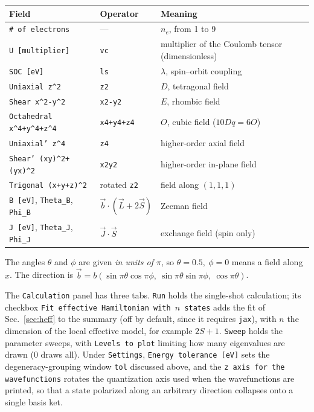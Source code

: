 \documentclass[11pt,a4paper]{article}
\newcommand{\op}[1]{\texttt{#1}}
\begin{document}
\begin{center}
\begin{tabular}{lll}
\toprule
Field & Operator & Meaning\\
\midrule
\op{\# of electrons} & --- & $n_e$, from 1 to 9\\
\op{U [multiplier]}  & \op{vc} & multiplier of the Coulomb tensor (dimensionless)\\
\op{SOC [eV]}        & \op{ls} & $\lambda$, spin--orbit coupling\\
\op{Uniaxial z\^{}2} & \op{z2} & $D$, tetragonal field\\
\op{Shear x\^{}2-y\^{}2} & \op{x2-y2} & $E$, rhombic field\\
\op{Octahedral x\^{}4+y\^{}4+z\^{}4} & \op{x4+y4+z4} & $O$, cubic field ($10Dq=6O$)\\
\op{Uniaxial' z\^{}4} & \op{z4} & higher-order axial field\\
\op{Shear' (xy)\^{}2+(yx)\^{}2} & \op{x2y2} & higher-order in-plane field\\
\op{Trigonal (x+y+z)\^{}2} & rotated \op{z2} & field along $(1,1,1)$\\
\op{B [eV]}, \op{Theta\_B}, \op{Phi\_B} & $\vec b\cdot(\vec L+2\vec S)$ & Zeeman field\\
\op{J [eV]}, \op{Theta\_J}, \op{Phi\_J} & $\vec J\cdot\vec S$ & exchange field (spin only)\\
\bottomrule
\end{tabular}
\end{center}

\noindent
The angles $\theta$ and $\phi$ are given \emph{in units of $\pi$}, so
$\theta=0.5,\ \phi=0$ means a field along $x$.  The direction is
$\vec b = b(\sin\pi\theta\cos\pi\phi,\ \sin\pi\theta\sin\pi\phi,\ \cos\pi\theta)$.

The \op{Calculation} panel has three tabs.  \op{Run} holds the single-shot
calculation; its checkbox \op{Fit effective Hamiltonian with $n$ states} adds
the fit of Sec.~\ref{sec:heff} to the summary (off by default, since it
requires \op{jax}), with $n$ the dimension of the local effective model, for
example $2S+1$.  \op{Sweep} holds the parameter sweeps, with \op{Levels to
plot} limiting how many eigenvalues are drawn (0 draws all).  Under
\op{Settings}, \op{Energy tolerance [eV]} sets the degeneracy-grouping window
\op{tol} discussed above, and the \op{z axis for the wavefunctions} rotates the
quantization axis used when the wavefunctions are printed, so that a state
polarized along an arbitrary direction collapses onto a single basis ket.
\end{document}
